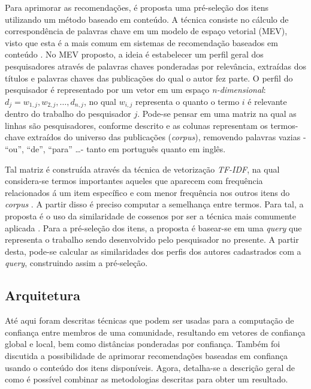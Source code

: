 \documentclass[12pt]{article}
\begin{document}
Para aprimorar as recomendações, é proposta uma pré-seleção dos itens utilizando um método baseado em conteúdo. A 
técnica consiste no cálculo de correspondência de palavras chave em um modelo de espaço vetorial (MEV), visto que 
esta é a mais comum em sistemas de recomendação baseados em conteúdo \cite{ricci2011introduction}. No MEV proposto, a ideia é estabelecer um 
perfil geral dos pesquisadores através de palavras chaves ponderadas por relevância, extraídas dos títulos e palavras chaves 
das publicações do qual o autor fez parte. O perfil do pesquisador é representado por um vetor em um espaço \textit{n-dimensional}: 
$d_j = {w_{1,j}, w_{2,j}, \dots ,d_{n,j}}$, no qual $w_{i,j}$ representa o quanto o termo $i$ é relevante dentro do trabalho do 
pesquisador $j$. Pode-se pensar em uma matriz na qual as linhas são pesquisadores, conforme descrito e as colunas representam os 
termos-chave extraídos do universo das publicações (\textit{corpus}), removendo palavras vazias - “ou”, “de”, “para” \dots - 
tanto em português quanto em inglês.

Tal matriz é construída através da técnica de vetorização \textit{TF-IDF}, na qual considera-se termos importantes aqueles que 
aparecem com frequência relacionados á um item específico e com menor frequência nos outros itens do \textit{corpus} 
\cite{pazzani2007content}. A partir disso é preciso computar a semelhança entre termos. Para tal, a proposta é o uso da 
similaridade de cossenos por ser a técnica mais comumente aplicada \cite{ricci2011introduction}. Para a pré-seleção dos itens, a 
proposta é basear-se em uma \textit{query} que representa o trabalho sendo desenvolvido pelo pesquisador no presente. A partir 
desta, pode-se calcular as similaridades dos perfis dos autores cadastrados com a \textit{query}, construindo assim a pré-seleção.

\subsection{Arquitetura} \label{sect:arch}

Até aqui foram descritas técnicas que podem ser usadas para a computação de confiança entre membros de uma comunidade, resultando 
em vetores de confiança global e local, bem como distâncias ponderadas por confiança. Também foi discutida a possibilidade de 
aprimorar recomendações baseadas em confiança usando o conteúdo dos itens disponíveis. Agora, detalha-se a descrição geral de como é 
possível combinar as metodologias descritas para obter um resultado. 
\end{document}
